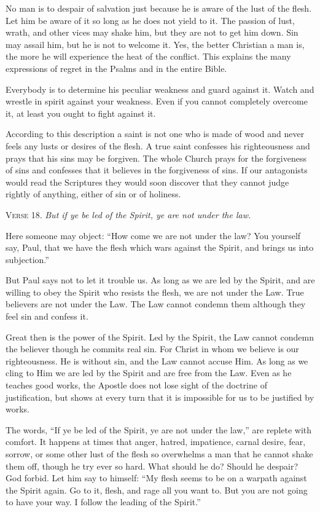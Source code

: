 No man is to despair of salvation just because he is aware of the lust of the flesh. Let him be aware of it so long as he does not yield to it. The passion of lust, wrath, and other vices may shake him, but they are not to get him down. Sin may assail him, but he is not to welcome it. Yes, the better Christian a man is, the more he will experience the heat of the conflict. This explains the many expressions of regret in the Psalms and in the entire Bible.

Everybody is to determine his peculiar weakness and guard against it. Watch and wrestle in spirit against your weakness. Even if you cannot completely overcome it, at least you ought to fight against it.

According to this description a saint is not one who is made of wood and never feels any lusts or desires of the flesh. A true saint confesses his righteousness and prays that his sins may be forgiven. The whole Church prays for the forgiveness of sins and confesses that it believes in the forgiveness of sins. If our antagonists would read the Scriptures they would soon discover that they cannot judge rightly of anything, either of sin or of holiness.

\textsc{Verse} 18. \emph{But if ye be led of the Spirit, ye are not under the law.}

Here someone may object: “How come we are not under the law? You yourself say, Paul, that we have the flesh which wars against the Spirit, and brings us into subjection.”

But Paul says not to let it trouble us. As long as we are led by the Spirit, and are willing to obey the Spirit who resists the flesh, we are not under the Law. True believers are not under the Law. The Law cannot condemn them although they feel sin and confess it.

Great then is the power of the Spirit. Led by the Spirit, the Law cannot condemn the believer though he commits real sin. For Christ in whom we believe is our righteousness. He is without sin, and the Law cannot accuse Him. As long as we cling to Him we are led by the Spirit and are free from the Law. Even as he teaches good works, the Apostle does not lose sight of the doctrine of justification, but shows at every turn that it is impossible for us to be justified by works.

The words, “If ye be led of the Spirit, ye are not under the law,” are replete with comfort. It happens at times that anger, hatred, impatience, carnal desire, fear, sorrow, or some other lust of the flesh so overwhelms a man that he cannot shake them off, though he try ever so hard. What should he do? Should he despair? God forbid. Let him say to himself: “My flesh seems to be on a warpath against the Spirit again. Go to it, flesh, and rage all you want to. But you are not going to have your way. I follow the leading of the Spirit.”

